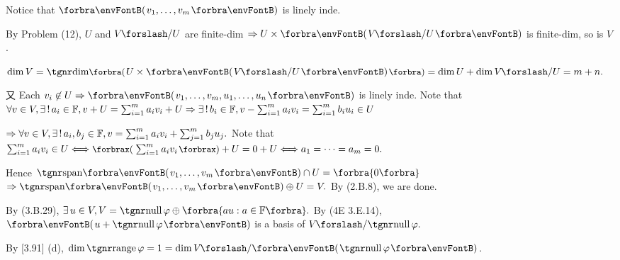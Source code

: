 \documentclass[a4paper, 11pt, UTF8]{article}
\begin{document}
\begin{large}
Notice that $\Par{v_1,\dots,v_m}$ is linely inde.\par\quad
By Problem (12), $U$ and $V\mySlash U$ are finite-dim $\Rightarrow U\times\Par{V\mySlash U}$ is finite-dim, so is $V$.\par\quad
$\dim V=\Dim\BigPar{U\times\Par{V\mySlash U}}=\dim U+\dim V\mySlash U=m+n.$\par\quad
又 Each $v_i\not\in U\Rightarrow\Par{v_1,\dots,v_m,u_1,\dots,u_n}$ is linely inde.\PfEnd\vspace{8pt}\quad
\Or Note that $\forall v\in V,\exists\,!\,a_i\in{\mathbb{F}},v+U=\sum_{i=1}^m a_i v_i+U\Rightarrow\exists\,!\,b_i\in{\mathbb{F}},v-\sum_{i=1}^m a_i v_i=\sum_{i=1}^m b_i u_i\in U$\vspace{4pt}\par\quad
{} $\Rightarrow \forall v\in V,\exists\,!\,a_i,b_j\in{\mathbb{F}},v=\sum_{i=1}^m a_i v_i+\sum_{j=1}^m b_j u_j.$\PfEnd\vspace{8pt}\quad
\Or Note that $\sum_{i=1}^m a_i v_i\in U\Longleftrightarrow\XPar{\sum_{i=1}^m a_i v_i}+U=0+U\Longleftrightarrow a_1=\dots=a_m=0.$\vspace{4pt}\par\quad
Hence $\Span{v_1,\dots,v_m}\cap U=\zeroSubs$
$\Rightarrow\Span{v_1,\dots,v_m}\oplus U=V.$ By (2.B.8), we are done.\PfEnd
\SepLine

\par\quad
By (3.B.29), $\exists\,u\in V,V=\null\varphi\oplus\Bra{au:a\in\Fbb}.$ By (4E 3.E.14), $\Par{u+\null\varphi}$ is a basis of $V\mySlash \null\varphi.$\par\quad
\Or By [3.91] (d), $\dim\range\varphi=1=\dim V\mySlash \Par{\null \varphi}$.\PfEnd
\SepLine


\end{large}
\end{document}
